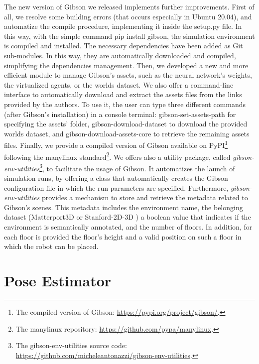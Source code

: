 The new version of Gibson we released implements further improvements. First of all, we resolve some building errors (that occurs especially in Ubuntu 20.04), and automatize the compile procedure, implementing it inside the \textsf{setup.py} file. In this way, with the simple command \textsf{pip install gibson}, the simulation environment is compiled and installed. The necessary dependencies have been added as Git sub-modules. In this way, they are automatically downloaded and compiled, simplifying the dependencies management. Then, we developed a new and more efficient module to manage Gibson's assets, such as the neural network's weights, the virtualized agents, or the worlds dataset. We also offer a command-line interface to automatically download and extract the assets files from the links provided by the authors. To use it, the user can type three different commands (after Gibson's installation) in a console terminal: \textsf{gibson-set-assets-path} for specifying the assets' folder, \textsf{gibson-download-dataset} to download the provided worlds dataset, and \textsf{gibson-download-assets-core} to retrieve the remaining assets files. Finally, we provide a compiled version of Gibson available on PyPI\footnote{The compiled version of Gibson: \url{https://pypi.org/project/gibson/}.} following the manylinux standard\footnote{The manylinux repository: \url{https://github.com/pypa/manylinux}.}. We offers also a utility package, called \textit{gibson-env-utilities}\footnote{The gibson-env-utilities source code: \url{https://github.com/micheleantonazzi/gibson-env-utilities}.}, to facilitate the usage of Gibson. It automatizes the launch of simulation runs, by offering a class that automatically creates the Gibson configuration file in which the run parameters are specified. Furthermore, \textit{gibson-env-utilities} provides a mechanism to store and retrieve the metadata related to Gibson's scenes. This metadata includes the environment name, the belonging dataset (Matterport3D \cite{matterport} or Stanford-2D-3D \cite{stanford2d3d}) a boolean value that indicates if the environment is semantically annotated, and the number of floors. In addition, for each floor is provided the floor's height and a valid position on such a floor in which the robot can be placed.


\section{Pose Estimator}

